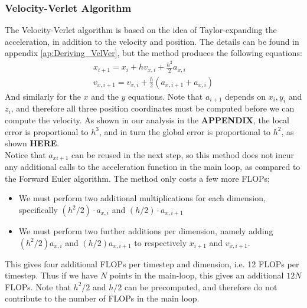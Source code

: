 \documentclass[a4paper, 10pt]{article}
\begin{document}
\subsubsection{Velocity-Verlet Algorithm}
The Velocity-Verlet algorithm is based on the idea of Taylor-expanding the acceleration, in addition to the velocity and position. The details can be found in appendix \ref{ap:Deriving_VelVer}, but the method produces the following equations:
\begin{equation} \label{eq:Vel_Ver_eq}
\begin{split}
x_{i+1}=x_i+hv_{x,i}+\frac{h^2}{2}a_{x,i}\\
v_{x,i+1}=v_{x,i}+\frac{h}{2}\left(a_{x,i+1}+a_{x,i}\right)
\end{split}
\end{equation}
And similarly for the $x$ and the $y$ equations. Note that $a_{i+1}$ depends on $x_i, y_i$ and $z_i$, and therefore all three position coordinates must be computed before we can compute the velocity. As shown in our analysis in the \textbf{APPENDIX}, the local error is proportional to $h^3$, and in turn the global error is proportional to $h^2$, as shown \textbf{HERE}.\\
\linebreak
Notice that $a_{x i+1}$ can be reused in the next step, so this method does not incur any additional calls to the acceleration function in the main loop, as compared to the Forward Euler algorithm. The method only costs a few more FLOPs;
\begin{itemize}
\item We must perform two additional multiplications for each dimension, specifically $(h^2/2)\cdot a_{x,i}$ and $(h/2)\cdot a_{x, i+1}$
\item We must perform two further additions per dimension, namely adding $(h^2/2)a_{x,i}$ and $(h/2)a_{x, i+1}$ to respectively $x_{i+1}$ and $v_{x, i+1}$.
\end{itemize} 
This gives four additional FLOPs per timestep and dimension, i.e. 12 FLOPs per timestep. Thus if we have $N$ points in the main-loop, this gives an additional $12N$ FLOPs. Note that $h^2/2$ and $h/2$ can be precomputed, and therefore do not contribute to the number of FLOPs in the main loop. 
\end{document}
